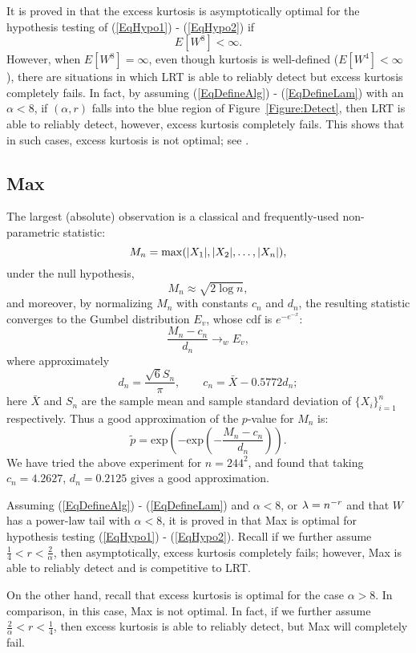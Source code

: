It is proved in \cite{DJ04b} that the excess kurtosis is asymptotically optimal for the hypothesis testing of (\ref{EqHypo1}) - (\ref{EqHypo2}) if 
\[
E [W^8] < \infty.
\]
However, when $E[W^8] = \infty$, even though kurtosis is well-defined ($E[W^4] < \infty$), there are situations in which LRT 
is able to reliably detect but excess kurtosis completely fails. In fact, by assuming (\ref{EqDefineAlg}) - (\ref{EqDefineLam}) 
with an $\alpha < 8$, if $(\alpha,r)$ falls into the blue region of Figure~\ref{Figure:Detect}, then LRT is able to reliably detect, 
however, excess kurtosis completely fails. This shows that in such cases, excess kurtosis is not optimal; see \cite{DJ04b}. 

\subsection{Max}
The largest (absolute) observation is a classical and frequently-used non-parametric statistic:
\[
M_n =  \mathrm{max}(|X_1|,|X_2|,\ldots, |X_n|),
\] 
under the null hypothesis, 
\[
M_n  \approx \sqrt{2 \log n},
\]
and moreover, by normalizing $M_n$ with constants $c_n$ and $d_n$, the resulting statistic 
converges to the Gumbel distribution $E_v$, whose cdf is $e^{-e^{-x}}$:
\[
\frac{M_n - c_n}{d_n}  \rightarrow_{w}    E_v,
\]
where approximately
\[
d_n = \frac{\sqrt{6} S_n}{\pi}, \qquad  c_n = \bar{X} - 0.5772 d_n; 
\]
here $\bar{X}$ and $S_n$ are the sample mean and sample standard deviation of $\{X_i\}_{i=1}^n$ respectively. 
Thus a good approximation of the $p$-value for $M_n$ is:
\[
\tilde{p} =  \mathrm{exp}(-\mathrm{exp}(-\frac{M_n - c_n}{d_n})). 
\]
We have tried the above experiment for $n = 244^2$, and found that taking $c_n = 4.2627$, $d_n = 0.2125$ gives a good approximation.  

Assuming (\ref{EqDefineAlg}) - (\ref{EqDefineLam}) and $\alpha < 8$, or $\lambda = n^{-r}$ and that $W$ has a power-law tail 
with $\alpha < 8$, it is proved in \cite{DJ04b} that Max is optimal for hypothesis testing (\ref{EqHypo1}) - (\ref{EqHypo2}). 
Recall if we further assume $\frac{1}{4} < r < \frac{2}{\alpha}$, then asymptotically, excess kurtosis completely fails; 
however, Max is able to reliably detect and is competitive to LRT. 

On the other hand, recall that excess kurtosis is optimal for the case $\alpha > 8$. In comparison, in this case, 
Max is not optimal. In fact, if we further assume $ \frac{2}{\alpha} < r < \frac{1}{4}$, then  excess kurtosis 
is able to reliably detect, but Max will completely fail. 

